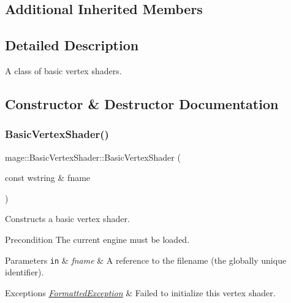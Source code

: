 \subsection*{Additional Inherited Members}


\subsection{Detailed Description}
A class of basic vertex shaders. 

\subsection{Constructor \& Destructor Documentation}
\hypertarget{classmage_1_1_basic_vertex_shader_ab00129cc3b679e531480153ece6a2456}{}\label{classmage_1_1_basic_vertex_shader_ab00129cc3b679e531480153ece6a2456} 
\subsubsection{\texorpdfstring{Basic\+Vertex\+Shader()}{BasicVertexShader()}\hspace{0.1cm}{\footnotesize\ttfamily [1/6]}}
{\footnotesize\ttfamily mage\+::\+Basic\+Vertex\+Shader\+::\+Basic\+Vertex\+Shader (\begin{DoxyParamCaption}\item[{const wstring \&}]{fname }\end{DoxyParamCaption})\hspace{0.3cm}{\ttfamily [explicit]}}

Constructs a basic vertex shader.

\begin{DoxyPrecond}{Precondition}
The current engine must be loaded. 
\end{DoxyPrecond}

\begin{DoxyParams}[1]{Parameters}
\mbox{\tt in}  & {\em fname} & A reference to the filename (the globally unique identifier). \\
\hline
\end{DoxyParams}

\begin{DoxyExceptions}{Exceptions}
{\em \hyperlink{structmage_1_1_formatted_exception}{Formatted\+Exception}} & Failed to initialize this vertex shader. \\
\hline
\end{DoxyExceptions}
\hypertarget{classmage_1_1_basic_vertex_shader_aa9db9c5bd780abfc08403df4374a6a15}{}\label{classmage_1_1_basic_vertex_shader_aa9db9c5bd780abfc08403df4374a6a15} 
